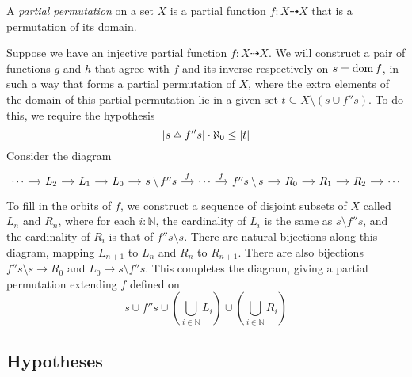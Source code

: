 \begin{definition}
    A \emph{partial permutation} on a set \( X \) is a partial function \( f : X \rightdasharrow X \) that is a permutation of its domain.
\end{definition}

Suppose we have an injective partial function \( f : X \rightdasharrow X \).
We will construct a pair of functions \( g \) and \( h \) that agree with \( f \) and its inverse respectively on \( s = \operatorname{dom} f \), in such a way that forms a partial permutation of \( X \), where the extra elements of the domain of this partial permutation lie in a given set \( t \subseteq X \setminus (s \cup f''s) \).
To do this, we require the hypothesis
\[ |s \symmdiff f''s| \cdot \aleph_0 \leq |t| \]
Consider the diagram
\[\begin{tikzcd}[column sep=small]
	\cdots & {L_2} & {L_1} & {L_0} & {s \setminus f''s} & \cdots & {f''s \setminus s} & {R_0} & {R_1} & {R_2} & \cdots
	\arrow[from=1-1, to=1-2]
	\arrow[from=1-2, to=1-3]
	\arrow[from=1-3, to=1-4]
	\arrow[from=1-4, to=1-5]
	\arrow["f", from=1-5, to=1-6]
	\arrow["f", from=1-6, to=1-7]
	\arrow[from=1-7, to=1-8]
	\arrow[from=1-8, to=1-9]
	\arrow[from=1-9, to=1-10]
	\arrow[from=1-10, to=1-11]
\end{tikzcd}\]
To fill in the orbits of \( f \), we construct a sequence of disjoint subsets of \( X \) called \( L_n \) and \( R_n \), where for each \( i : \mathbb N \), the cardinality of \( L_i \) is the same as \( s \setminus f''s \), and the cardinality of \( R_i \) is that of \( f''s \setminus s \).
There are natural bijections along this diagram, mapping \( L_{n + 1} \) to \( L_n \) and \( R_n \) to \( R_{n + 1} \).
There are also bijections \( f '' s \setminus s \to R_0 \) and \( L_0 \to s \setminus f '' s \).
This completes the diagram, giving a partial permutation extending \( f \) defined on
\[ s \cup f '' s \cup \left( \bigcup_{i \in \mathbb N} L_i \right) \cup \left( \bigcup_{i \in \mathbb N} R_i \right) \]

\subsection{Hypotheses}
\label{ss:foa:hypotheses}

